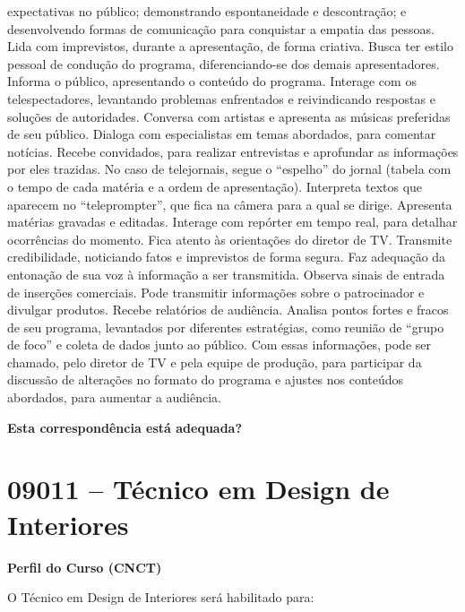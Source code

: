 \documentclass[
]{article}
\begin{document}
expectativas no público; demonstrando espontaneidade e descontração; e
desenvolvendo formas de comunicação para conquistar a empatia das
pessoas. Lida com imprevistos, durante a apresentação, de forma
criativa. Busca ter estilo pessoal de condução do programa,
diferenciando-se dos demais apresentadores. Informa o público,
apresentando o conteúdo do programa. Interage com os telespectadores,
levantando problemas enfrentados e reivindicando respostas e soluções de
autoridades. Conversa com artistas e apresenta as músicas preferidas de
seu público. Dialoga com especialistas em temas abordados, para comentar
notícias. Recebe convidados, para realizar entrevistas e aprofundar as
informações por eles trazidas. No caso de telejornais, segue o
``espelho'' do jornal (tabela com o tempo de cada matéria e a ordem de
apresentação). Interpreta textos que aparecem no ``teleprompter'', que
fica na câmera para a qual se dirige. Apresenta matérias gravadas e
editadas. Interage com repórter em tempo real, para detalhar ocorrências
do momento. Fica atento às orientações do diretor de TV. Transmite
credibilidade, noticiando fatos e imprevistos de forma segura. Faz
adequação da entonação de sua voz à informação a ser transmitida.
Observa sinais de entrada de inserções comerciais. Pode transmitir
informações sobre o patrocinador e divulgar produtos. Recebe relatórios
de audiência. Analisa pontos fortes e fracos de seu programa, levantados
por diferentes estratégias, como reunião de ``grupo de foco'' e coleta
de dados junto ao público. Com essas informações, pode ser chamado, pelo
diretor de TV e pela equipe de produção, para participar da discussão de
alterações no formato do programa e ajustes nos conteúdos abordados,
para aumentar a audiência.

\begin{Form}
\textbf{Esta correspondência está adequada?} \\ 
\end{Form}

\newpage
\section{ 09011 -- Técnico em Design de Interiores }

\textbf{Perfil do Curso (CNCT)}

O Técnico em Design de Interiores será habilitado para:
\end{document}
